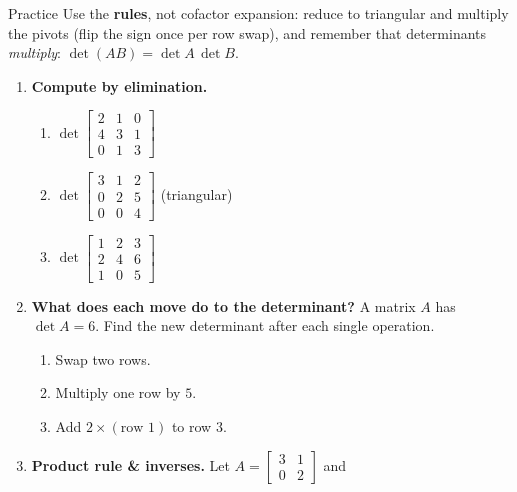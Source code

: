 \documentclass[10pt]{article}
\begin{document}
\namedateperiod

\vspace{0.12in}

\begin{notesbox}{Practice}
Use the \textbf{rules}, not cofactor expansion: reduce to triangular and multiply the pivots (flip the
sign once per row swap), and remember that determinants \emph{multiply}: $\det(AB)=\det A\,\det B$.

\begin{enumerate}[leftmargin=1.9em, itemsep=11pt]
  \item \textbf{Compute by elimination.}
    \begin{enumerate}[label=(\alph*), leftmargin=1.8em, itemsep=5pt]
      \item $\det\begin{bmatrix} 2 & 1 & 0 \\ 4 & 3 & 1 \\ 0 & 1 & 3 \end{bmatrix}$ \hfill {}
      \item $\det\begin{bmatrix} 3 & 1 & 2 \\ 0 & 2 & 5 \\ 0 & 0 & 4 \end{bmatrix}$ \; {\footnotesize(triangular)} \hfill {}
      \item $\det\begin{bmatrix} 1 & 2 & 3 \\ 2 & 4 & 6 \\ 1 & 0 & 5 \end{bmatrix}$ \hfill {}
    \end{enumerate}
  \item \textbf{What does each move do to the determinant?} A matrix $A$ has $\det A=6$. Find the new
        determinant after each single operation.
    \begin{enumerate}[label=(\alph*), leftmargin=1.8em, itemsep=5pt]
      \item Swap two rows. \hfill {}
      \item Multiply one row by $5$. \hfill {}
      \item Add $2\times(\text{row }1)$ to row $3$. \hfill {}
    \end{enumerate}
  \item \textbf{Product rule \& inverses.} Let $A=\begin{bmatrix} 3 & 1 \\ 0 & 2 \end{bmatrix}$ and

\end{enumerate}
\end{notesbox}
\end{document}
